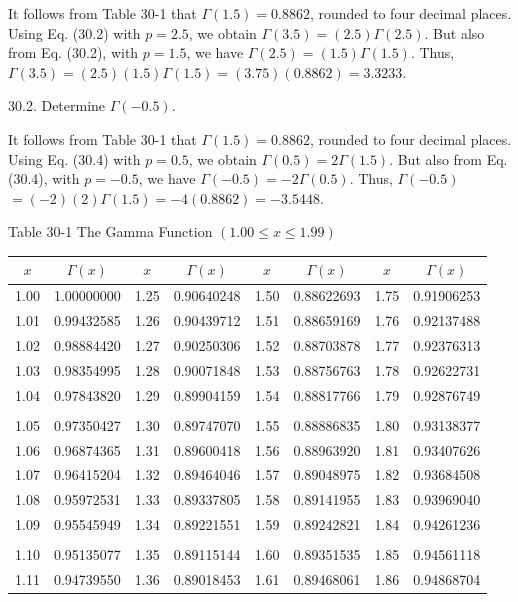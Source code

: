 \documentclass[10pt]{article}
\begin{document}
It follows from Table 30-1 that $\Gamma(1.5)=0.8862$, rounded to four decimal places. Using Eq. (30.2) with $p=2.5$, we obtain $\Gamma(3.5)=(2.5) \Gamma(2.5)$. But also from Eq. (30.2), with $p=1.5$, we have $\Gamma(2.5)=(1.5) \Gamma(1.5)$. Thus, $\Gamma(3.5)=(2.5)(1.5) \Gamma(1.5)=(3.75)(0.8862)=3.3233$.

30.2. Determine $\Gamma(-0.5)$.

It follows from Table 30-1 that $\Gamma(1.5)=0.8862$, rounded to four decimal places. Using Eq. (30.4) with $p=0.5$, we obtain $\Gamma(0.5)=2 \Gamma(1.5)$. But also from Eq. (30.4), with $p=-0.5$, we have $\Gamma(-0.5)=-2 \Gamma(0.5)$. Thus, $\Gamma(-0.5)$ $=(-2)(2) \Gamma(1.5)=-4(0.8862)=-3.5448$.

Table 30-1 The Gamma Function $(1.00 \leq x \leq 1.99)$

\begin{center}
\begin{tabular}{|c|c|c|c|c|c|c|c|}
\hline
$x$ & $\Gamma(x)$ & $x$ & $\Gamma(x)$ & $x$ & $\Gamma(x)$ & $x$ & $\Gamma(x)$ \\
\hline
1.00 & 1.00000000 & 1.25 & 0.90640248 & 1.50 & 0.88622693 & 1.75 & 0.91906253 \\
1.01 & 0.99432585 & 1.26 & 0.90439712 & 1.51 & 0.88659169 & 1.76 & 0.92137488 \\
1.02 & 0.98884420 & 1.27 & 0.90250306 & 1.52 & 0.88703878 & 1.77 & 0.92376313 \\
1.03 & 0.98354995 & 1.28 & 0.90071848 & 1.53 & 0.88756763 & 1.78 & 0.92622731 \\
1.04 & 0.97843820 & 1.29 & 0.89904159 & 1.54 & 0.88817766 & 1.79 & 0.92876749 \\
 &  &  &  &  &  &  &  \\
1.05 & 0.97350427 & 1.30 & 0.89747070 & 1.55 & 0.88886835 & 1.80 & 0.93138377 \\
1.06 & 0.96874365 & 1.31 & 0.89600418 & 1.56 & 0.88963920 & 1.81 & 0.93407626 \\
1.07 & 0.96415204 & 1.32 & 0.89464046 & 1.57 & 0.89048975 & 1.82 & 0.93684508 \\
1.08 & 0.95972531 & 1.33 & 0.89337805 & 1.58 & 0.89141955 & 1.83 & 0.93969040 \\
1.09 & 0.95545949 & 1.34 & 0.89221551 & 1.59 & 0.89242821 & 1.84 & 0.94261236 \\
 &  &  &  &  &  &  &  \\
1.10 & 0.95135077 & 1.35 & 0.89115144 & 1.60 & 0.89351535 & 1.85 & 0.94561118 \\
1.11 & 0.94739550 & 1.36 & 0.89018453 & 1.61 & 0.89468061 & 1.86 & 0.94868704 \\

\end{tabular}
\end{center}
\end{document}
